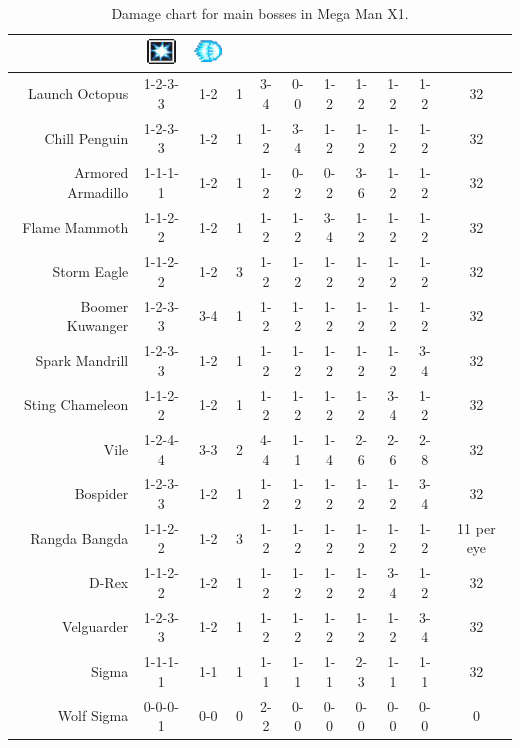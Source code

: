 \begin{table}[htp]
{\begin{tabular}{r *{10}{c}}
		&{\includegraphics[width=30px, height=25px]{figures/X1/weapons/S_ice.jpg}} &{\includegraphics[width=30px, height=25px]{figures/X1/weapons/hadoken_sprite.png}}\\
		\midrule
		Launch Octopus&	 	1-2-3-3& 1-2& 1 & 3-4& 0-0& 1-2& 1-2& 1-2& 1-2& 32\\
		Chill Penguin&	 	1-2-3-3& 1-2& 1 & 1-2& 3-4& 1-2& 1-2& 1-2& 1-2& 32\\
		Armored Armadillo& 	1-1-1-1& 1-2& 1 & 1-2& 0-2& 0-2& 3-6& 1-2& 1-2& 32\\
		Flame Mammoth& 		1-1-2-2& 1-2& 1 & 1-2& 1-2& 3-4& 1-2& 1-2& 1-2& 32\\
		Storm Eagle& 		1-1-2-2& 1-2& 3 & 1-2& 1-2& 1-2& 1-2& 1-2& 1-2& 32\\
		Boomer Kuwanger&	1-2-3-3& 3-4& 1 & 1-2& 1-2& 1-2& 1-2& 1-2& 1-2& 32\\
		Spark Mandrill&		1-2-3-3& 1-2& 1 & 1-2& 1-2& 1-2& 1-2& 1-2& 3-4& 32\\
		Sting Chameleon&	1-1-2-2& 1-2& 1 & 1-2& 1-2& 1-2& 1-2& 3-4& 1-2& 32\\
		Vile &				1-2-4-4& 3-3& 2 & 4-4& 1-1& 1-4& 2-6& 2-6& 2-8& 32\\
		Bospider&			1-2-3-3& 1-2& 1 & 1-2& 1-2& 1-2& 1-2& 1-2& 3-4& 32\\
		Rangda Bangda&		1-1-2-2& 1-2& 3 & 1-2& 1-2& 1-2& 1-2& 1-2& 1-2& 11 per eye\\
		D-Rex&				1-1-2-2& 1-2& 1 & 1-2& 1-2& 1-2& 1-2& 3-4& 1-2& 32\\
		Velguarder&			1-2-3-3& 1-2& 1 & 1-2& 1-2& 1-2& 1-2& 1-2& 3-4& 32\\
		Sigma&				1-1-1-1& 1-1& 1 & 1-1& 1-1& 1-1& 2-3& 1-1& 1-1& 32\\
		Wolf Sigma&			0-0-0-1& 0-0& 0 & 2-2& 0-0& 0-0& 0-0& 0-0& 0-0& 0\\
		\bottomrule
	\end{tabular}
	}	
	\caption{Damage chart for main bosses in Mega Man X1.}
\end{table}

\newpage
